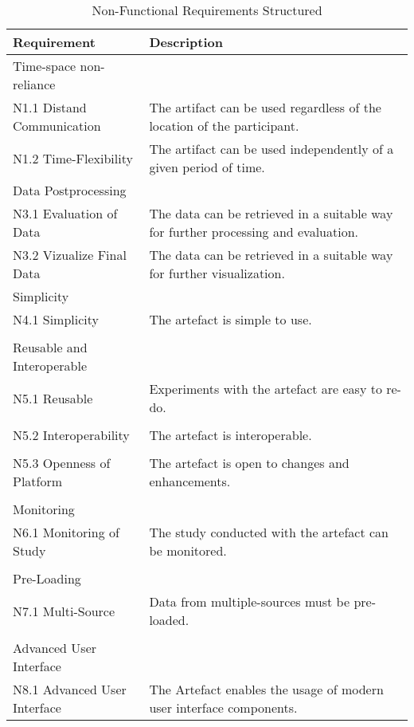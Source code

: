 \begin{table}[htbp]
    \centering
    \small
    \begin{tabular}{L{0.35\textwidth}L{0.59\textwidth}}
    \hline
Requirement                             & Description \\ \hline
    Time-space non-reliance     &             \\ \hline
    N1.1 Distand Communication      & The artifact can be used regardless of the location of the participant.            \\
    N1.2 Time-Flexibility           & The artifact can be used independently of a given period of time.            \\ \hline
    Data Postprocessing &             \\ \hline
    N3.1 Evaluation of Data         & The data can be retrieved in a suitable way for further processing and evaluation.            \\
    N3.2 Vizualize Final Data       & The data can be retrieved in a suitable way for further visualization.             \\ \hline
    Simplicity                  &            \\ \hline
    N4.1 Simplicity                 & The artefact is simple to use.           \\
    & \\ \hline
    Reusable and Interoperable  &             \\ \hline
    N5.1 Reusable                   & Experiments with the artefact are easy to re-do.           \\
    & \\
    N5.2 Interoperability           & The artefact is interoperable.            \\
    & \\
    N5.3 Openness of Platform       & The artefact is open to changes and enhancements. \\
    & \\ \hline
    Monitoring                  &             \\ \hline
    N6.1 Monitoring of Study        & The study conducted with the artefact can be monitored.            \\ 
    & \\ \hline
    Pre-Loading                 &             \\ \hline
    N7.1 Multi-Source             & Data from multiple-sources must be pre-loaded.            \\ 
    & \\ \hline
    Advanced User Interface   &             \\ \hline
    N8.1 Advanced User Interface  & The Artefact enables the usage of modern user interface components.            \\ \hline
    \end{tabular}
    \caption[Non-Functional Requirements Structured]{Non-Functional Requirements Structured}\label{tab:NonFuncRequirementsCat}
    \end{table}
